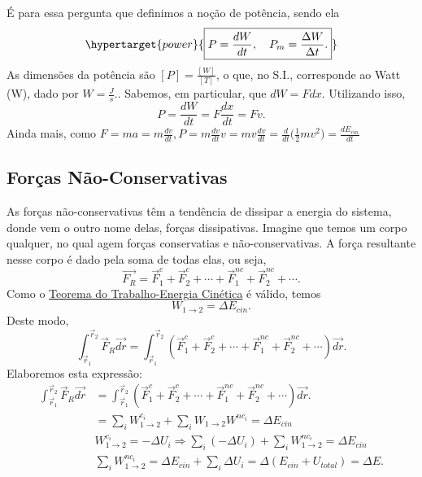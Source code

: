 \documentclass{article}
\begin{document}
  É para essa pergunta que definimos a no\c cão de potência, sendo ela 
    \[
      \hypertarget{power}{\boxed{P = \frac{dW}{dt},\quad P_{m} = \frac{\Delta W}{\Delta t}.}}
    \]
    As dimensões da potência são \([P]=\frac{[W]}{[T]}\), o que, no S.I., corresponde ao Watt (W), dado por
  \(W = \frac{J}{s}.\). Sabemos, em particular, que \(dW = Fdx.\) Utilizando isso, 
    \[
      P = \frac{dW}{dt} = F \frac{dx}{dt} = Fv.
    \]
    Ainda mais, como \(F = m a = m \frac{dv}{dt}, P=m \frac{dv}{dt}v = mv \frac{dv}{dt} = \frac{d}{dt}\biggl(\frac{1}{2}mv^{2}\biggr) = \frac{dE_{cin}}{dt}\)
\subsection{For\c cas Não-Conservativas}
  As for\c cas não-conservativas têm a tendência de dissipar a energia do sistema, donde vem o 
outro nome delas, for\c cas dissipativas. Imagine que temos um corpo qualquer, no qual
agem for\c cas conservatias e não-conservativas. A for\c ca resultante nesse corpo
é dado pela soma de todas elas, ou seja, 
  \[
    \vec{F_{R}} = \vec{F}_{1}^{c} + \vec{F}_{2}^{c} + \cdots +\vec{F}_{1}^{nc} + \vec{F}_{2}^{nc} + \cdots.
  \]
  Como o \hyperlink{kin_en_theo}{Teorema do Trabalho-Energia Cinética} é válido, temos 
    \[
      W_{1\rightarrow2} = \Delta E_{cin}.
    \]
  Deste modo, 
    \[
      \int_{\vec{r}_{1}}^{\vec{r}_{2}}\vec{F}_{R}\vec{dr} = \int_{\vec{r}_{1}}^{\vec{r}_{2}}( \vec{F}_{1}^{c} + \vec{F}_{2}^{c} + \cdots +\vec{F}_{1}^{nc} + \vec{F}_{2}^{nc} + \cdots)\vec{dr}.
    \]
    Elaboremos esta expressão: 
   \begin{align*}
      \int_{\vec{r}_{1}}^{\vec{r}_{2}}\vec{F}_{R}\vec{dr} &= \int_{\vec{r}_{1}}^{\vec{r}_{2}}( \vec{F}_{1}^{c} + \vec{F}_{2}^{c} + \cdots +\vec{F}_{1}^{nc} + \vec{F}_{2}^{nc} + \cdots)\vec{dr}.\\
                                                          &= \sum\limits_{i}^{}W_{1\rightarrow2}^{c_{i}} + \sum\limits_{i}^{}W_{1\rightarrow2}W^{nc_{i}} = \Delta E_{cin}\\
                                                          &W_{1\rightarrow2}^{c_{i}} = -\Delta U_{i} \Rightarrow \sum\limits_{i}^{}(-\Delta U_{i}) + \sum\limits_{i}^{}W_{1\rightarrow2}^{nc_{i}} = \Delta E_{cin}\\
                                                          &\sum\limits_{i}^{}W_{1\rightarrow2}^{nc_{i}}=\Delta E_{cin}+\sum\limits_{i}^{}\Delta U_{i} = \Delta (E_{cin}+U_{total}) = \Delta E.
   \end{align*}
\end{document}
